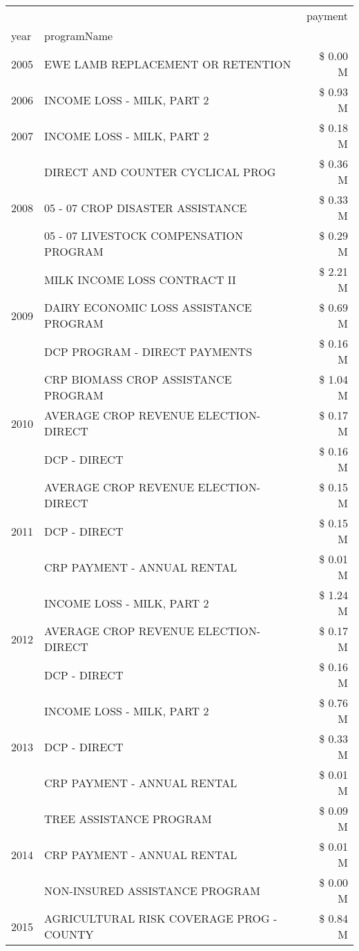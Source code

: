 \begin{tabular}{llr}
\toprule
 &  & payment \\
year & programName &  \\
\midrule
2005 & EWE LAMB REPLACEMENT OR RETENTION & \$ 0.00 M \\
\cline{1-3}
2006 & INCOME LOSS - MILK, PART 2 & \$ 0.93 M \\
\cline{1-3}
2007 & INCOME LOSS - MILK, PART 2 & \$ 0.18 M \\
\cline{1-3}
\multirow[t]{3}{*}{2008} & DIRECT AND COUNTER CYCLICAL PROG & \$ 0.36 M \\
 & 05 - 07 CROP DISASTER ASSISTANCE & \$ 0.33 M \\
 & 05 - 07 LIVESTOCK COMPENSATION PROGRAM & \$ 0.29 M \\
\cline{1-3}
\multirow[t]{3}{*}{2009} & MILK INCOME LOSS CONTRACT II & \$ 2.21 M \\
 & DAIRY ECONOMIC LOSS ASSISTANCE PROGRAM & \$ 0.69 M \\
 & DCP PROGRAM - DIRECT PAYMENTS & \$ 0.16 M \\
\cline{1-3}
\multirow[t]{3}{*}{2010} & CRP BIOMASS CROP ASSISTANCE PROGRAM & \$ 1.04 M \\
 & AVERAGE CROP REVENUE ELECTION-DIRECT & \$ 0.17 M \\
 & DCP - DIRECT & \$ 0.16 M \\
\cline{1-3}
\multirow[t]{3}{*}{2011} & AVERAGE CROP REVENUE ELECTION-DIRECT & \$ 0.15 M \\
 & DCP - DIRECT & \$ 0.15 M \\
 & CRP PAYMENT - ANNUAL RENTAL & \$ 0.01 M \\
\cline{1-3}
\multirow[t]{3}{*}{2012} & INCOME LOSS - MILK, PART 2 & \$ 1.24 M \\
 & AVERAGE CROP REVENUE ELECTION-DIRECT & \$ 0.17 M \\
 & DCP - DIRECT & \$ 0.16 M \\
\cline{1-3}
\multirow[t]{3}{*}{2013} & INCOME LOSS - MILK, PART 2 & \$ 0.76 M \\
 & DCP - DIRECT & \$ 0.33 M \\
 & CRP PAYMENT - ANNUAL RENTAL & \$ 0.01 M \\
\cline{1-3}
\multirow[t]{3}{*}{2014} & TREE ASSISTANCE PROGRAM & \$ 0.09 M \\
 & CRP PAYMENT - ANNUAL RENTAL & \$ 0.01 M \\
 & NON-INSURED ASSISTANCE PROGRAM & \$ 0.00 M \\
\cline{1-3}
\multirow[t]{3}{*}{2015} & AGRICULTURAL RISK COVERAGE PROG - COUNTY & \$ 0.84 M \\

\end{tabular}
